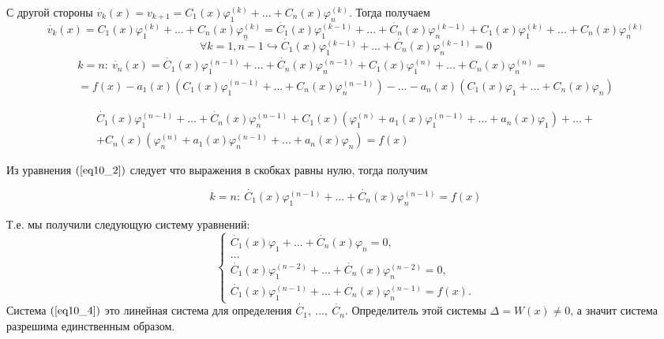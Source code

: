 С другой стороны $\dot{v_k}(x) = v_{k+1} = C_1(x)\varphi_1^{(k)} + ... + C_n(x)\varphi_n^{(k)}$. Тогда получаем
\begin{equation}
\dot{v_k}(x) = C_1(x)\varphi_1^{(k)} + ... + C_n(x)\varphi_n^{(k)} = \dot{C_1}(x)\varphi_1^{(k-1)} + ... + \dot{C_n}(x)\varphi_n^{(k-1)} + C_1(x)\varphi_1^{(k)} + ... + C_n(x)\varphi_n^{(k)}
\end{equation}
\begin{equation}
\forall k =\overline{1, n-1} \hookrightarrow \dot{C_1}(x)\varphi_1^{(k-1)} + ... + \dot{C_n}(x)\varphi_n^{(k-1)} = 0
\end{equation}
\begin{eqnarray*}
k = n: ~\dot{v_n}(x) = \dot{C_1}(x)\varphi_1^{(n-1)} + ... + \dot{C_n}(x)\varphi_n^{(n-1)} + C_1(x)\varphi_1^{(n)} + ... + C_n(x)\varphi_n^{(n)} = \\ = f(x) - a_1(x)\left(C_1(x)\varphi_1^{(n-1)} + ... + C_n(x)\varphi_n^{(n-1)}\right) - ... - a_n(x)\left(C_1(x)\varphi_1 + ... + C_n(x)\varphi_n\right)
\end{eqnarray*}

\begin{eqnarray*}
\dot{C_1}(x)\varphi_1^{(n-1)} + ... + \dot{C_n}(x)\varphi_n^{(n-1)} + C_1(x)\left(\varphi_1^{(n)} + a_1(x)\varphi_1^{(n-1)} + ... + a_n(x)\varphi_1\right) + ... + \\ + C_n(x)\left(\varphi_n^{(n)} + a_1(x)\varphi_n^{(n-1)} + ... + a_n(x)\varphi_n\right) = f(x)
\end{eqnarray*}

Из уравнения $(\ref{eq10_2})$ следует что выражения в скобках равны нулю, тогда получим

\[k = n: ~\dot{C_1}(x)\varphi_1^{(n-1)} + ... + \dot{C_n}(x)\varphi_n^{(n-1)} = f(x)\]

Т.е. мы получили следующую систему уравнений:
\begin{equation}\label{eq10_4}
 \begin{cases}
   \dot{C_1}(x)\varphi_1 + ... + \dot{C_n}(x)\varphi_n = 0, 
   \\
   ...
   \\
   \dot{C_1}(x)\varphi_1^{(n-2)} + ... + \dot{C_n}(x)\varphi_n^{(n-2)} = 0,
   \\
   \dot{C_1}(x)\varphi_1^{(n-1)} + ... + \dot{C_n}(x)\varphi_n^{(n-1)} = f(x).
 \end{cases}
\end{equation}
Система $(\ref{eq10_4})$ это линейная система для определения $\dot{C_1}, ~..., ~\dot{C_n}$.
Определитель этой системы $\Delta = W(x) \neq 0$, а значит система разрешима единственным образом.